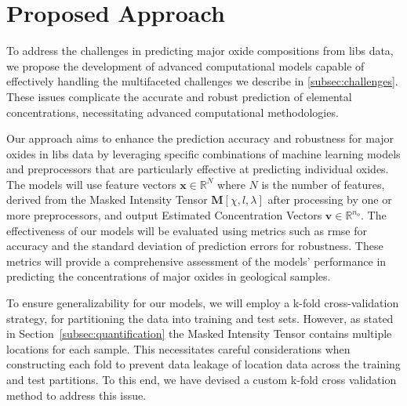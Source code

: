 \section{Proposed Approach}
To address the challenges in predicting major oxide compositions from \gls{libs} data, we propose the development of advanced computational models capable of effectively handling the multifaceted challenges we describe in \ref{subsec:challenges}.
These issues complicate the accurate and robust prediction of elemental concentrations, necessitating advanced computational methodologies. 

Our approach aims to enhance the prediction accuracy and robustness for major oxides in \gls{libs} data by leveraging specific combinations of machine learning models and preprocessors that are particularly effective at predicting individual oxides.
The models will use feature vectors $\mathbf{x} \in \mathbb{R}^N$ where $N$ is the number of features, derived from the Masked Intensity Tensor $\mathbf{M}[\chi, l, \lambda]$ after processing by one or more preprocessors, and output Estimated Concentration Vectors $\mathbf{v} \in \mathbb{R}^{n_o}$. 
The effectiveness of our models will be evaluated using metrics such as \gls{rmse} for accuracy and the standard deviation of prediction errors for robustness.
These metrics will provide a comprehensive assessment of the models' performance in predicting the concentrations of major oxides in geological samples.

To ensure generalizability for our models, we will employ a k-fold cross-validation strategy, for partitioning the data into training and test sets.
However, as stated in Section~\ref{subsec:quantification} the Masked Intensity Tensor contains multiple locations for each sample.
This necessitates careful considerations when constructing each fold to prevent data leakage of location data across the training and test partitions.
To this end, we have devised a custom k-fold cross validation method to address this issue.

